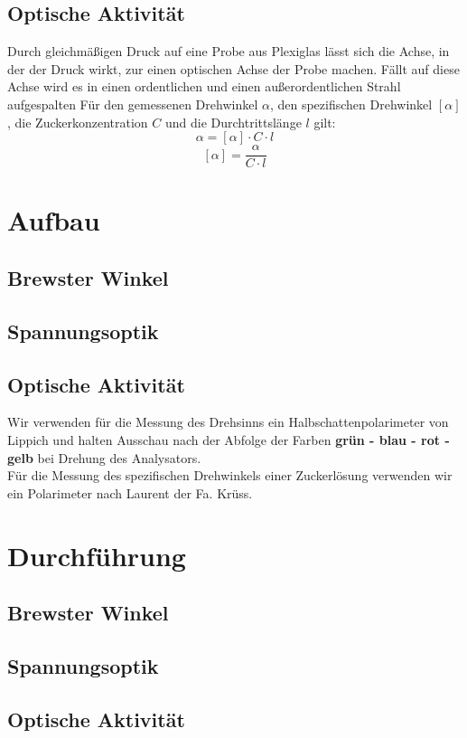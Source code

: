 \documentclass{article}
\begin{document}
\subsection{Optische Aktivität}
Durch gleichmäßigen Druck auf eine Probe aus Plexiglas lässt sich die Achse, in der der Druck wirkt, zur einen optischen Achse der Probe machen. Fällt auf diese Achse wird es in einen ordentlichen und einen außerordentlichen Strahl aufgespalten
Für den gemessenen Drehwinkel $\alpha$, den spezifischen Drehwinkel $[\alpha]$, die Zuckerkonzentration $C$ und die Durchtrittslänge $l$ gilt:
\begin{equation*}
\alpha=[\alpha]\cdot C \cdot l
\end{equation*} 
\begin{equation}
\label{eq:SpezDrehwinkel}
[\alpha]=\frac{\alpha}{ C \cdot l }
\end{equation} 
\section{Aufbau}
\subsection{Brewster Winkel}
\subsection{Spannungsoptik}
\subsection{Optische Aktivität}
Wir verwenden für die Messung des Drehsinns ein Halbschattenpolarimeter von Lippich und halten Ausschau nach der Abfolge der Farben \textbf{grün - blau - rot - gelb} bei Drehung des Analysators.\\
Für die Messung des spezifischen Drehwinkels einer Zuckerlösung verwenden wir ein Polarimeter nach Laurent der Fa. Krüss.
\section{Durchführung}
\subsection{Brewster Winkel}
\subsection{Spannungsoptik}
\subsection{Optische Aktivität}
\end{document}
